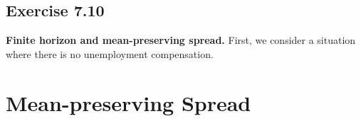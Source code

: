 \documentclass[11pt]{article}
\theoremstyle{definition}
\theoremstyle{boldtitle} %
\numberwithin{equation}{section}
\numberwithin{figure}{section}
\numberwithin{table}{section}
\begin{document}

\subsection{Exercise 7.10}
\textbf{Finite horizon and mean-preserving spread.}
First, we consider a situation where there is no unemployment compensation.

\section{Mean-preserving Spread}
\end{document}
